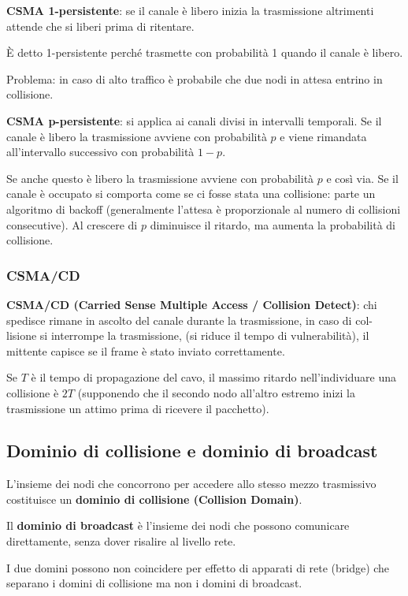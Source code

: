             \textbf{CSMA 1-persistente}: se il canale è libero inizia la trasmissione altrimenti attende che si liberi prima di ritentare.

            È detto 1-persistente perché trasmette con probabilità 1 quando il canale è libero.

            Problema: in caso di alto traffico è probabile che due nodi in attesa entrino in collisione.

            \textbf{CSMA p-persistente}: si applica ai canali divisi in intervalli temporali. Se il canale è libero la trasmissione avviene con probabilità $p$ e viene rimandata all'intervallo successivo con probabilità $1 - p$.
            
            Se anche questo è libero la trasmissione avviene con probabilità $p$ e così via. Se il canale è occupato si comporta come se ci fosse stata una collisione: parte un algoritmo di backoff (generalmente l'attesa è proporzionale al numero di collisioni consecutive).
            Al crescere di $p$ diminuisce il ritardo, ma aumenta la probabilità di collisione.

        \subsubsection{CSMA/CD}
            \textbf{CSMA/CD (Carried Sense Multiple Access / Collision Detect)}: chi spedisce rimane in ascolto del canale durante la trasmissione, in caso di col- lisione si interrompe la trasmissione, (si riduce il tempo di vulnerabilità), il mittente capisce se il frame è stato inviato correttamente.
        
            Se $T$ è il tempo di propagazione del cavo, il massimo ritardo nell'individuare una collisione è $2T$ (supponendo che il secondo nodo all'altro estremo inizi la trasmissione un attimo prima di ricevere il pacchetto).

    \subsection{Dominio di collisione e dominio di broadcast}
        L'insieme dei nodi che concorrono per accedere allo stesso mezzo trasmissivo costituisce un \textbf{dominio di collisione (Collision Domain)}.
        
        Il \textbf{dominio di broadcast} è l'insieme dei nodi che possono comunicare direttamente, senza dover risalire al livello rete.

        I due domini possono non coincidere per effetto di apparati di rete (bridge) che separano i domini di collisione ma non i domini di broadcast.

